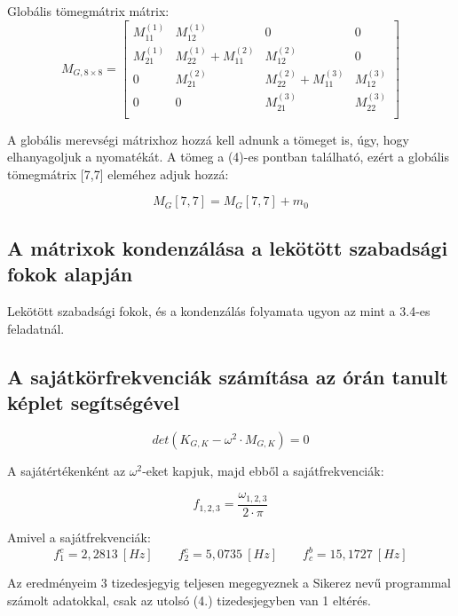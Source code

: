 \documentclass{article}
\newcommand{\rpm}{\raisebox{.2ex}{$\scriptstyle\pm$}}
\begin{document}
			Globális tömegmátrix mátrix:
			\begin{equation}
				M_{G,8\times8}=
					\begin{bmatrix}
					M_{11}^{(1)} & M_{12}^{(1)}              & 0            			    & 0            \\
					M_{21}^{(1)} & M_{22}^{(1)}+M_{11}^{(2)} & M_{12}^{(2)}  			    & 0            \\
					0            & M_{21}^{(2)}              & M_{22}^{(2)} + M_{11}^{(3)}  & M_{12}^{(3)} \\
					0            & 0						 & M_{21}^{(3)} 				& M_{22}^{(3)} \\
					\end{bmatrix}
			\end{equation}
			
			A globális merevségi mátrixhoz hozzá kell adnunk a tömeget is, úgy, hogy elhanyagoljuk a nyomatékát. A tömeg a (4)-es pontban található, ezért a globális tömegmátrix [7,7] eleméhez adjuk hozzá:
			
			\begin{equation}
				M_G[7,7] = M_G[7,7] + m_0
			\end{equation}
		
		
		\subsection{A mátrixok kondenzálása a lekötött szabadsági fokok alapján}
		
			Lekötött szabadsági fokok, és a kondenzálás folyamata ugyon az mint a 3.4-es feladatnál.
		
		\subsection{A sajátkörfrekvenciák számítása az órán tanult képlet segítségével}
	
			\begin{equation}
				det(K_{G,K} - \omega^2 \cdot M_{G,K}) = 0
			\end{equation}
			
			A sajátértékenként az $\omega^2$-eket kapjuk, majd ebből a sajátfrekvenciák:
			
			\begin{equation}
				f_{1,2,3}=\frac{\omega_{1,2,3}}{2\cdot \pi}
			\end{equation}
			
			Amivel a sajátfrekvenciák:	
			\[f_1^c=2,2813~[Hz] \qquad f_2^c=5,0735~[Hz] \qquad f_c^b=15,1727~[Hz]  \]
			
			Az eredményeim 3 tizedesjegyig teljesen megegyeznek a Sikerez nevű programmal számolt adatokkal, csak az utolsó (4.) tizedesjegyben van \rpm1 eltérés.
\end{document}
